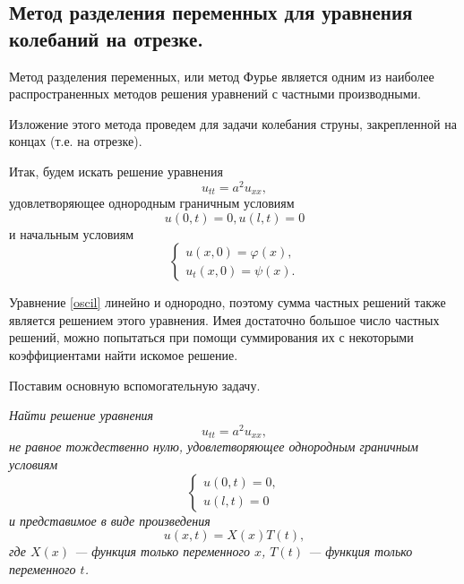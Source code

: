 \subsection{Метод разделения переменных для уравнения колебаний на отрезке.}

Метод разделения переменных, или метод Фурье является одним из наиболее распространенных методов решения уравнений с частными производными.

Изложение этого метода проведем для задачи колебания струны, закрепленной на концах (т.е. на отрезке). 

Итак, будем искать решение уравнения 
\begin{equation} \label{oscil}
	u_{tt} = a^2 u_{xx},
\end{equation}
удовлетворяющее однородным граничным условиям 
\begin{equation} \label{bord_cond}
	u(0, t) = 0, u(l, t) = 0
\end{equation}
и начальным условиям 
\begin{equation} \label{init_cond}
	\begin{cases}
		u(x, 0) = \varphi(x),
		\\
		u_t(x, 0) = \psi(x).
	\end{cases}
\end{equation}

Уравнение \eqref{oscil} линейно и однородно, поэтому сумма частных решений также является решением этого уравнения. Имея достаточно большое число частных решений, можно попытаться при помощи суммирования их с некоторыми коэффициентами найти искомое решение. 

Поставим основную вспомогательную задачу.

\textit{Найти решение уравнения}
\begin{equation*}
	u_{tt} = a^2 u_{xx},
\end{equation*}
\textit{не равное тождественно нулю, удовлетворяющее однородным граничным условиям}
\begin{equation}
	\label{ucond}
	\begin{cases}
		u(0, t) = 0,
		\\
		u(l, t) = 0
	\end{cases}
\end{equation}
\textit{и представимое в виде произведения}
\begin{equation} \label{sol_form}
	u(x, t) = X(x) T(t),
\end{equation}
\textit{где $X(x)$ --- функция только переменного $x$, $T(t)$ --- функция только переменного $t$.}

